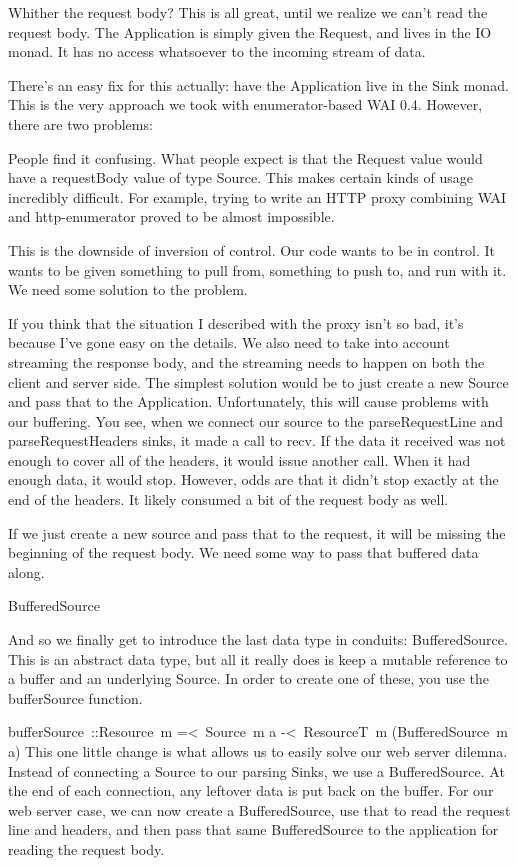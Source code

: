 Whither the request body?
This is all great, until we realize we can't read the request body. The
Application is simply given the Request, and lives in the
IO monad. It has no access whatsoever to the incoming stream of data.

There's an easy fix for this actually: have the Application live in the
Sink monad. This is the very approach we took with
enumerator-based WAI 0.4. However, there are two problems:


People find it confusing. What people expect is that the Request
value would have a requestBody value of type Source.
This makes certain kinds of usage incredibly difficult. For example, trying to write an
HTTP
proxy combining WAI and http-enumerator proved to be almost impossible.

This is the downside of inversion of control. Our code wants to be in control. It wants to
be
given something to pull from, something to push to, and run with it. We need some solution
to the
problem.

If you think that the situation I described with the proxy isn't so bad, it's because I've
gone easy on the details. We also need to take into account streaming the response body,
and the
streaming needs to happen on both the client and server side.
The simplest solution would be to just create a new Source and pass that to
the Application. Unfortunately, this will cause problems with our buffering. You
see, when we connect our source to the parseRequestLine and
parseRequestHeaders sinks, it made a call to recv. If the data
it received was not enough to cover all of the headers, it would issue another call. When
it had
enough data, it would stop. However, odds are that it didn't stop exactly at the end of
the headers. It likely consumed a bit of the request body as well.

If we just create a new source and pass that to the request, it will be missing the
beginning
of the request body. We need some way to pass that buffered data along.

BufferedSource

And so we finally get to introduce the last data type in conduits:
BufferedSource. This is an abstract data type, but all it really does is keep a
mutable reference to a buffer and an underlying Source. In order to create one
of these, you use the bufferSource function.

bufferSource ::Resource m =< Source m a -< ResourceT m (BufferedSource m a)
This one little change is what allows us to easily solve our web server dilemna. Instead
of
connecting a Source to our parsing Sinks, we use a
BufferedSource. At the end of each connection, any leftover data is put back on
the buffer. For our web server case, we can now create a BufferedSource, use
that to read the request line and headers, and then pass that same
BufferedSource to the application for reading the request body.


